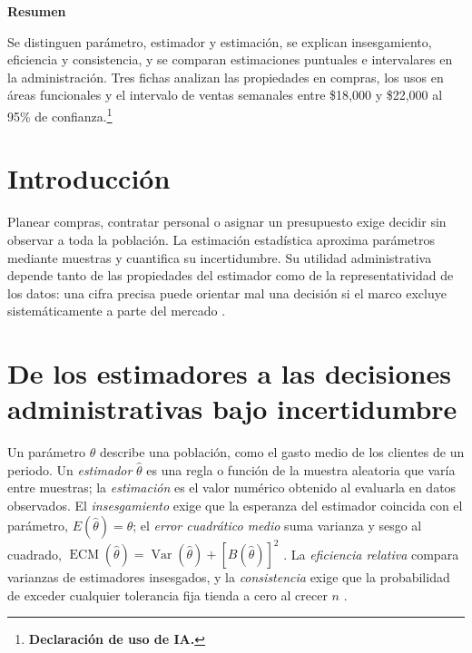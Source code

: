 \fontsize{12}{14.4}\selectfont{}\justifying
\begingroup
\noindent\textbf{Resumen}\par
Se distinguen parámetro, estimador y estimación, se explican insesgamiento, eficiencia y consistencia, y se comparan estimaciones puntuales e intervalares en la administración. Tres fichas analizan las propiedades en compras, los usos en áreas funcionales y el intervalo de ventas semanales entre \$18,000 y \$22,000 al 95\% de confianza.\footnote{\textbf{Declaración de uso de IA.} \estadisticadeclaracionia}
\par\smallskip
\renewcommand{\contentsname}{Tabla de contenido}
\setcounter{tocdepth}{1}
\setlength{\cftbeforetoctitleskip}{2pt}\setlength{\cftaftertoctitleskip}{2pt}
\setlength{\cftbeforesecskip}{1pt}
\renewcommand{\cfttoctitlefont}{\normalfont\fontsize{12}{14.4}\selectfont\bfseries\color{itescaRedDark}}
\tableofcontents
\endgroup
\smallskip
\section{Introducción}
Planear compras, contratar personal o asignar un presupuesto exige decidir sin observar a toda la población. La estimación estadística aproxima parámetros mediante muestras y cuantifica su incertidumbre. Su utilidad administrativa depende tanto de las propiedades del estimador como de la representatividad de los datos: una cifra precisa puede orientar mal una decisión si el marco excluye sistemáticamente a parte del mercado \citep{holmesBusiness2023,bradley2021}.

\section{De los estimadores a las decisiones administrativas bajo incertidumbre}
Un parámetro $\theta$ describe una población, como el gasto medio de los clientes de un periodo. Un \textit{estimador} $\hat{\theta}$ es una regla o función de la muestra aleatoria que varía entre muestras; la \textit{estimación} es el valor numérico obtenido al evaluarla en datos observados. El \textit{insesgamiento} exige que la esperanza del estimador coincida con el parámetro, $E(\hat{\theta})=\theta$; el \textit{error cuadrático medio} suma varianza y sesgo al cuadrado, $\operatorname{ECM}(\hat{\theta})=\operatorname{Var}(\hat{\theta})+[B(\hat{\theta})]^2$ \citep[sec.~8.2]{wackerly2010}. La \textit{eficiencia relativa} compara varianzas de estimadores insesgados, y la \textit{consistencia} exige que la probabilidad de exceder cualquier tolerancia fija tienda a cero al crecer $n$ \citep[secs.~9.2--9.3]{wackerly2010}.

